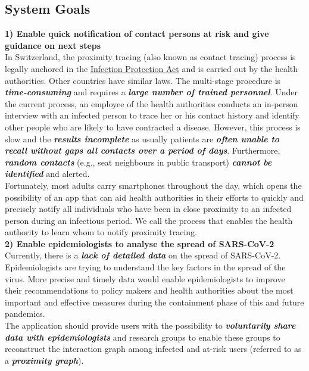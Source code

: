 \documentclass[12pt,a4paper]{article}
\begin{document}
\subsection*{System Goals}
\textbf{1) Enable quick notification of contact persons at risk and give guidance on next
steps}\\
In Switzerland, the proximity tracing (also known as contact tracing) process is legally
anchored in the \href{http://www.rki.de}{\underline{Infection Protection Act}} and is carried out by the health authorities. Other countries have similar laws. The multi-stage procedure is \textbf{\textit{time-consuming}} and requires a \textbf{\textit{large number of trained personnel}}. Under the current process, an employee of the health authorities conducts an in-person interview with an infected person to trace her or his contact history and identify other people who are likely to have contracted a disease. However, this process is slow and the \textbf{\textit{results incomplete}} as usually patients are \textbf{\textit{often unable to recall without gaps all contacts over a period of days}}. Furthermore, \textbf{\textit{random contacts}} (e.g., seat neighbours in public transport) \textbf{\textit{cannot be identified}}  and alerted.\\[0.3cm]
Fortunately, most adults carry smartphones throughout the day, which opens the possibility
of an app that can aid health authorities in their efforts to quickly and precisely notify all individuals who have been in close proximity to an infected person during an infectious period. We call the process that enables the health authority to learn whom to notify proximity tracing.\\[0.3cm]
\textbf{2) Enable epidemiologists to analyse the spread of SARS-CoV-2}\\
Currently, there is a \textbf{\textit{lack of detailed data}} on the spread of SARS-CoV-2. Epidemiologists
are trying to understand the key factors in the spread of the virus. More precise and timely
data would enable epidemiologists to improve their recommendations to policy makers and
health authorities about the most important and effective measures during the containment
phase of this and future pandemics.\\[0.3cm]
The application should provide users with the possibility to \textbf{\textit{voluntarily share data with epidemiologists}} and research groups to enable these groups to reconstruct the interaction graph among infected and at-risk users (referred to as a \textbf{\textit{proximity graph}}).
\end{document}
